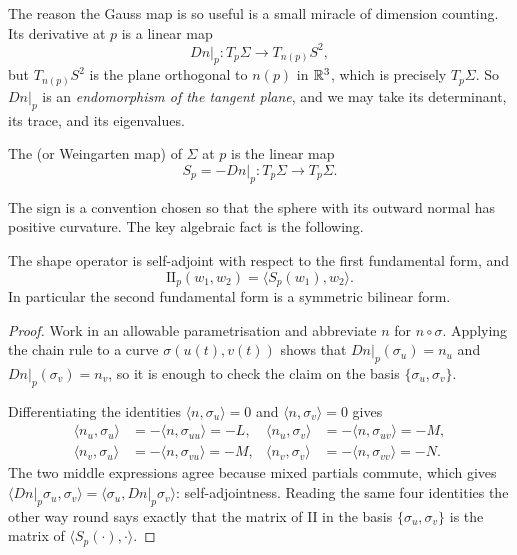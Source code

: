 \documentclass[a4paper]{scrartcl}
\begin{document}
The reason the Gauss map is so useful is a small miracle of dimension counting. Its derivative at $p$ is a linear map
$$
\left.Dn\right|_p : T_p\Sigma \rightarrow T_{n(p)}S^2,
$$
but $T_{n(p)}S^2$ is the plane orthogonal to $n(p)$ in $\mathbb{R}^3$, which is precisely $T_p\Sigma$. So $\left.Dn\right|_p$ is an \emph{endomorphism of the tangent plane}, and we may take its determinant, its trace, and its eigenvalues.

\begin{definition}
    The  (or Weingarten map) of $\Sigma$ at $p$ is the linear map
    $$
    S_p = -\left.Dn\right|_p : T_p\Sigma \rightarrow T_p\Sigma.
    $$
\end{definition}

The sign is a convention chosen so that the sphere with its outward normal has positive curvature. The key algebraic fact is the following.

\begin{lemma}
    The shape operator is self-adjoint with respect to the first fundamental form, and
    $$
    \mathrm{II}_p(w_1, w_2) = \langle S_p(w_1), w_2\rangle.
    $$
    In particular the second fundamental form is a symmetric bilinear form.
\end{lemma}
\begin{proof}
    Work in an allowable parametrisation and abbreviate $n$ for $n\circ\sigma$. Applying the chain rule to a curve $\sigma(u(t), v(t))$ shows that $\left.Dn\right|_p(\sigma_u) = n_u$ and $\left.Dn\right|_p(\sigma_v) = n_v$, so it is enough to check the claim on the basis $\{\sigma_u, \sigma_v\}$.

    Differentiating the identities $\langle n, \sigma_u\rangle = 0$ and $\langle n, \sigma_v\rangle = 0$ gives
    \begin{align*}
        \langle n_u, \sigma_u\rangle &= -\langle n, \sigma_{uu}\rangle = -L, & \langle n_u, \sigma_v \rangle &= -\langle n, \sigma_{uv}\rangle = -M, \\
        \langle n_v, \sigma_u\rangle &= -\langle n, \sigma_{vu}\rangle = -M, & \langle n_v, \sigma_v \rangle &= -\langle n, \sigma_{vv}\rangle = -N.
    \end{align*}
    The two middle expressions agree because mixed partials commute, which gives $\langle \left.Dn\right|_p \sigma_u, \sigma_v\rangle = \langle \sigma_u, \left.Dn\right|_p\sigma_v\rangle$: self-adjointness. Reading the same four identities the other way round says exactly that the matrix of $\mathrm{II}$ in the basis $\{\sigma_u, \sigma_v\}$ is the matrix of $\langle S_p(\cdot), \cdot\rangle$.
\end{proof}
\end{document}
